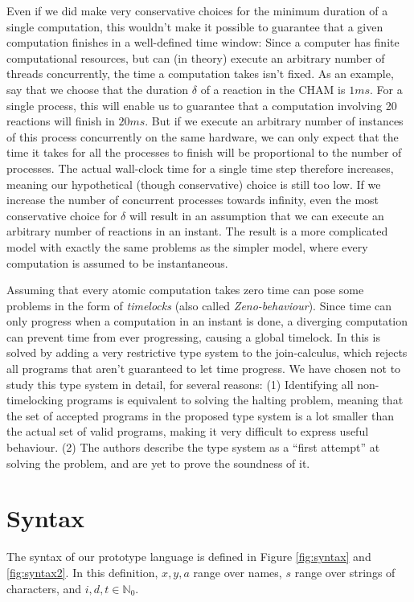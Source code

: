 Even if we did make very conservative choices for the minimum duration
of a single computation, this wouldn't make it possible to guarantee
that a given computation finishes in a well-defined time window: Since
a computer has finite computational resources, but can (in theory)
execute an arbitrary number of threads concurrently, the time a
computation takes isn't fixed. As an example, say that we choose that
the duration $\delta$ of a reaction in the CHAM is $1 ms$. For a
single process, this will enable us to guarantee that a computation
involving 20 reactions will finish in $20 ms$. But if we execute an
arbitrary number of instances of this process concurrently on the same
hardware, we can only expect that the time it takes for all the
processes to finish will be proportional to the number of processes.
The actual wall-clock time for a single time step therefore increases,
meaning our hypothetical (though conservative) choice is still too
low. If we increase the number of concurrent processes towards
infinity, even the most conservative choice for $\delta$ will result
in an assumption that we can execute an arbitrary number of reactions
in an instant. The result is a more complicated model with exactly the
same problems as the simpler model, where every computation is assumed
to be instantaneous.

Assuming that every atomic computation takes zero time can pose some
problems in the form of \emph{timelocks} (also called
\emph{Zeno-behaviour}). Since time can only progress when a
computation in an instant is done, a diverging computation can prevent
time from ever progressing, causing a global timelock.  In
\cite{timed-join} this is solved by adding a very restrictive type
system to the join-calculus, which rejects all programs that aren't
guaranteed to let time progress. We have chosen not to study this type
system in detail, for several reasons: (1) Identifying all
non-timelocking programs is equivalent to solving the halting problem,
meaning that the set of accepted programs in the proposed type system
is a lot smaller than the actual set of valid programs, making it very
difficult to express useful behaviour. (2) The authors describe the
type system as a ``first attempt'' at solving the problem, and are yet
to prove the soundness of it.


\section{Syntax}

The syntax of our prototype language is defined in Figure \ref{fig:syntax} and
\ref{fig:syntax2}. In this definition, $x,y,a$ range over names, $s$ range over
strings of characters, and $i,d,t \in \mathbb{N}_0$.

